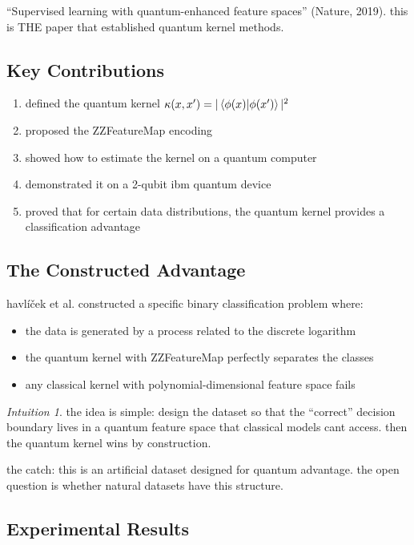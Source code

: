 \documentclass[11pt,a4paper]{article}
\theoremstyle{definition}
\theoremstyle{remark}
\newtheorem*{intuition}{Intuition}
\begin{document}
``Supervised learning with quantum-enhanced feature spaces'' (Nature, 2019). this is THE paper that established quantum kernel methods.

\subsection{Key Contributions}

\begin{enumerate}
    \item defined the quantum kernel $\kappa(x,x') = |\braket{\phi(x)|\phi(x')}|^2$
    \item proposed the ZZFeatureMap encoding
    \item showed how to estimate the kernel on a quantum computer
    \item demonstrated it on a 2-qubit ibm quantum device
    \item proved that for certain data distributions, the quantum kernel provides a classification advantage
\end{enumerate}

\subsection{The Constructed Advantage}

havl\'i\v{c}ek et al. constructed a specific binary classification problem where:
\begin{itemize}
    \item the data is generated by a process related to the discrete logarithm
    \item the quantum kernel with ZZFeatureMap perfectly separates the classes
    \item any classical kernel with polynomial-dimensional feature space fails
\end{itemize}

\begin{intuition}
the idea is simple: design the dataset so that the ``correct'' decision boundary lives in a quantum feature space that classical models cant access. then the quantum kernel wins by construction.

the catch: this is an artificial dataset designed for quantum advantage. the open question is whether natural datasets have this structure.
\end{intuition}

\subsection{Experimental Results}
\end{document}
